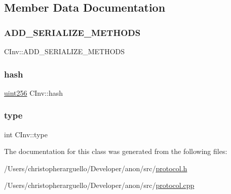 \subsection{Member Data Documentation}
\mbox{\label{class_c_inv_a3dc91b40ff6fe8c2c8879c81de67e209}} 
\subsubsection{\texorpdfstring{A\+D\+D\+\_\+\+S\+E\+R\+I\+A\+L\+I\+Z\+E\+\_\+\+M\+E\+T\+H\+O\+DS}{ADD\_SERIALIZE\_METHODS}}
{\footnotesize\ttfamily C\+Inv\+::\+A\+D\+D\+\_\+\+S\+E\+R\+I\+A\+L\+I\+Z\+E\+\_\+\+M\+E\+T\+H\+O\+DS}

\mbox{\label{class_c_inv_abfa04c38e9c0def9a2b09a9c43929744}} 
\subsubsection{\texorpdfstring{hash}{hash}}
{\footnotesize\ttfamily \mbox{\hyperlink{classuint256}{uint256}} C\+Inv\+::hash}

\mbox{\label{class_c_inv_a2da8a26c6b8824011e3144459d278c75}} 
\subsubsection{\texorpdfstring{type}{type}}
{\footnotesize\ttfamily int C\+Inv\+::type}



The documentation for this class was generated from the following files\+:\begin{DoxyCompactItemize}
\item 
/\+Users/christopherarguello/\+Developer/anon/src/\mbox{\hyperlink{protocol_8h}{protocol.\+h}}\item 
/\+Users/christopherarguello/\+Developer/anon/src/\mbox{\hyperlink{protocol_8cpp}{protocol.\+cpp}}\end{DoxyCompactItemize}
